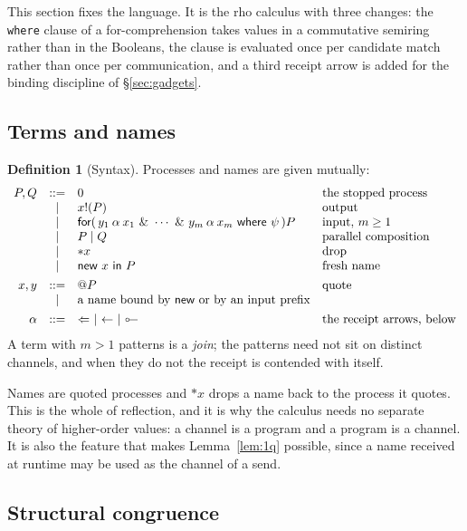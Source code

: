 \documentclass[11pt,a4paper]{article}
\theoremstyle{plain}
\theoremstyle{definition}
\newtheorem{definition}[theorem]{Definition}
\theoremstyle{remark}
\newcommand{\lolli}{\mathrel{\reflectbox{$\multimap$}}}
\begin{document}
This section fixes the language. It is the rho calculus \cite{MeredithRadestock}
with three changes: the \texttt{where} clause of a for-comprehension takes
values in a commutative semiring rather than in the Booleans, the clause is
evaluated once per candidate match rather than once per communication, and a
third receipt arrow is added for the binding discipline of
\S\ref{sec:gadgets}.

\subsection{Terms and names}

\begin{definition}[Syntax]\label{def:syntax}
Processes and names are given mutually:
\[
\begin{array}{rcll}
  P,Q &::=& 0 & \text{the stopped process}\\
      &\mid& x!(P) & \text{output}\\
      &\mid& \textsf{for}(\,y_1 \mathbin{\alpha} x_1 \ \&\ \cdots
             \ \&\ y_m \mathbin{\alpha} x_m \ \textsf{where}\ \psi\,)P
             & \text{input, } m \geq 1\\
      &\mid& P \mid Q & \text{parallel composition}\\
      &\mid& {*}x & \text{drop}\\
      &\mid& \textsf{new}\ x\ \textsf{in}\ P & \text{fresh name}\\[4pt]
  x,y &::=& @P & \text{quote}\\
      &\mid& \text{a name bound by \textsf{new} or by an input prefix}\\[4pt]
  \alpha &::=& \Leftarrow \ \mid\ \leftarrow \ \mid\ \lolli
             & \text{the receipt arrows, below}
\end{array}
\]
A term with $m > 1$ patterns is a \emph{join}; the patterns need not sit on
distinct channels, and when they do not the receipt is contended with itself.
\end{definition}

Names are quoted processes and $*x$ drops a name back to the process it quotes.
This is the whole of reflection, and it is why the calculus needs no separate
theory of higher-order values: a channel is a program and a program is a
channel. It is also the feature that makes Lemma~\ref{lem:1q} possible, since a
name received at runtime may be used as the channel of a send.

\subsection{Structural congruence}
\end{document}
